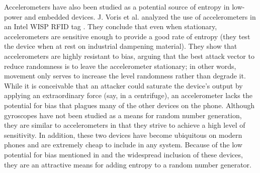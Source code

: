 \documentclass[conference]{IEEEtran}
\begin{document}


Accelerometers have also been studied as a potential source of entropy in low-power and embedded devices.  J. Voris et al. analyzed the use of
accelerometers in an Intel WISP RFID tag \cite{voris}.  They conclude that even when stationary, accelerometers are sensitive enough to provide
a good rate of entropy (they test the device when at rest on industrial dampening material).  They show that accelerometers are
highly resistant to bias, arguing that the best attack vector to reduce randomness is to leave the accelerometer stationary; in other words,
movement only serves to increase the level randomness rather than degrade it.  While it is conceivable that an attacker could saturate the device's
output by applying an extraordinary force (say, in a centrifuge), an accelerometer lacks the potential for bias that plagues many of the other
devices on the phone.  Although gyroscopes have not been studied as a means for random number generation, they are similar to accelerometers in
that they strive to achieve a high level of sensitivity.  In addition, these two devices have become ubiquitous on modern phones and are extremely
cheap to include in any system.  Because of the low potential for bias mentioned in \cite{voris} and the widespread inclusion of these devices,
they are an attractive means for adding entropy to a random number generator.
\end{document}
